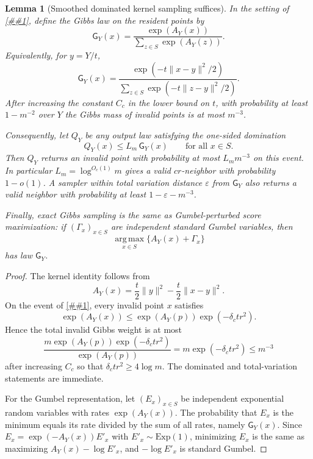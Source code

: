 \documentclass[10pt]{article}
\newcommand{\cref}[1]{\ref{##1}}
\newtheorem{lemma}[theorem]{Lemma}
\theoremstyle{definition}
\begin{document}
\begin{lemma}[Smoothed dominated kernel sampling suffices]\label{lem:smoothed-gibbs-suffices}
   In the setting of \cref{lem:smoothed-max-score-margin}, define the Gibbs law
   on the resident points by
   \[
      \mathsf G_Y(x)
      =
      \frac{\exp(A_Y(x))}
           {\sum_{z\in S}\exp(A_Y(z))}.
   \]
   Equivalently, for $y=Y/t$,
   \[
      \mathsf G_Y(x)
      =
      \frac{\exp(-t\|x-y\|^2/2)}
           {\sum_{z\in S}\exp(-t\|z-y\|^2/2)} .
   \]
   After increasing the constant $C_c$ in the lower bound on $t$, with
   probability at least $1-m^{-2}$ over $Y$ the Gibbs mass of invalid points is
   at most $m^{-3}$.

   Consequently, let $Q_Y$ be any output law satisfying the one-sided
   domination
   \[
      Q_Y(x)\le L_m\,\mathsf G_Y(x)
      \qquad\text{for all }x\in S.
   \]
   Then $Q_Y$ returns an invalid point with probability at most
   $L_m m^{-3}$ on this event. In particular $L_m=\log^{O_c(1)}m$ gives a
   valid $cr$-neighbor with probability $1-o(1)$. A sampler within total
   variation distance $\varepsilon$ from $\mathsf G_Y$ also returns a valid
   neighbor with probability at least $1-\varepsilon-m^{-3}$.

   Finally, exact Gibbs sampling is the same as Gumbel-perturbed score
   maximization: if $(\Gamma_x)_{x\in S}$ are independent standard Gumbel
   variables, then
   \[
      \operatorname*{arg\,max}_{x\in S}\{A_Y(x)+\Gamma_x\}
   \]
   has law $\mathsf G_Y$.
\end{lemma}

\begin{proof}
   The kernel identity follows from
   \[
      A_Y(x)=\frac t2\|y\|^2-\frac t2\|x-y\|^2 .
   \]
   On the event of \cref{lem:smoothed-max-score-margin}, every invalid point
   $x$ satisfies
   \[
      \exp(A_Y(x))\le \exp(A_Y(p))\exp(-\delta_c t r^2).
   \]
   Hence the total invalid Gibbs weight is at most
   \[
      \frac{m\exp(A_Y(p))\exp(-\delta_c t r^2)}
           {\exp(A_Y(p))}
      =
      m\exp(-\delta_c t r^2)
      \le m^{-3}
   \]
   after increasing $C_c$ so that $\delta_c t r^2\ge4\log m$. The dominated
   and total-variation statements are immediate.

   For the Gumbel representation, let $(E_x)_{x\in S}$ be independent
   exponential random variables with rates $\exp(A_Y(x))$. The probability
   that $E_x$ is the minimum equals its rate divided by the sum of all rates,
   namely $\mathsf G_Y(x)$. Since $E_x=\exp(-A_Y(x))E'_x$ with
   $E'_x\sim\mathrm{Exp}(1)$, minimizing $E_x$ is the same as maximizing
   $A_Y(x)-\log E'_x$, and $-\log E'_x$ is standard Gumbel.
\end{proof}
\end{document}
